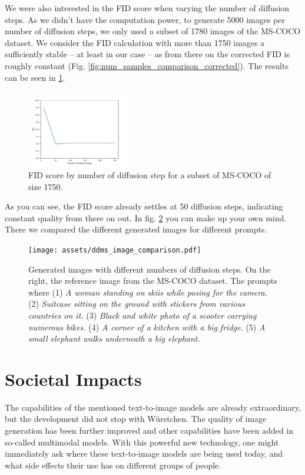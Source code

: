 \documentclass[11pt]{article}
\begin{document}
We were also interested in the FID score when varying the number of diffusion steps. As we didn't have the computation power, to generate 5000 images per number of diffusion steps, we only used a subset of 1780 images of the MS-COCO dataset. We consider the FID calculation with more than 1750 images a sufficiently stable – at least in our case – as from there on the corrected FID is roughly constant (Fig. \ref{fig:num_samples_comparison_corrected}). The results can be seen in \ref{fig:ddms_comparison}.
\begin{figure}[h]
    \centering
    \includegraphics[width=0.4\textwidth]{assets/ddms_comparison.pdf}
    \caption{FID score by number of diffusion step for a subset of MS-COCO of size 1750.}
    \label{fig:ddms_comparison}
\end{figure}

As you can see, the FID score already settles at 50 diffusion steps, indicating constant quality from there on out. In fig. \ref{fig:ddms_image_comparison} you can make up your own mind. There we compared the different generated images for different prompts.

\begin{figure}[h!]
    \centering
    \texttt{[image: assets/ddms\_image\_comparison.pdf]}
    \caption{Generated images with different numbers of diffusion steps. On the right, the reference image from the MS-COCO dataset. The prompts where (1) \textit{A woman standing on skiis while posing for the camera.} (2) \textit{Suitcase sitting on the ground with stickers from various countries on it.} (3) \textit{Black and white photo of a scooter carrying numerous bikes.} (4) \textit{A corner of a kitchen with a big fridge.} (5) \textit{A small elephant walks underneath a big elephant.}}
    \label{fig:ddms_image_comparison}
\end{figure}




\newpage

\section{Societal Impacts}
The capabilities of the mentioned text-to-image models are already extraordinary, but the development did not stop with Würstchen. The quality of image generation has been further improved\cite{lin2023designbenchexploringbenchmarkingdalle} and other capabilities have been added in so-called multimodal models\cite{yasunaga2022retrievalaugmentedmultimodellanguagemodeling}. With this powerful new technology, one might immediately ask where these text-to-image models are being used today, and what side effects their use has on different groups of people.
\end{document}
